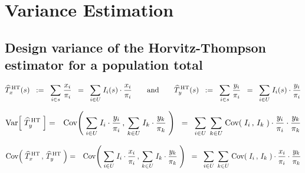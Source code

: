 

\section{Variance Estimation}
\setcounter{theorem}{0}
\setcounter{equation}{0}


\renewcommand{\theenumi}{\roman{enumi}}
\renewcommand{\labelenumi}{\textnormal{(\theenumi)}$\;\;$}


\subsection{Design variance of the Horvitz-Thompson estimator for a population total}

\vskip 0.5cm

\begin{equation*}
\widehat{T}^{\,\textnormal{HT}}_{x}(s)
\;\; := \;\;
	\underset{i \in s}{\sum}\; \dfrac{x_{i}}{\pi_{i}}
\;\; = \;\;
	\underset{i \in U}{\sum}\; I_{i}(s)\cdot\dfrac{x_{i}}{\pi_{i}}
\quad
\quad
\textnormal{and}
\quad
\quad
\widehat{T}^{\,\textnormal{HT}}_{y}(s)
\;\; := \;\;
	\underset{i \in s}{\sum}\; \dfrac{y_{i}}{\pi_{i}}
\;\; = \;\;
	\underset{i \in U}{\sum}\; I_{i}(s)\cdot\dfrac{y_{i}}{\pi_{i}}
\end{equation*}

\begin{eqnarray*}
\textnormal{Var}\!\left[\;\widehat{T}^{\,\textnormal{HT}}_{y}\;\right]
& = &
	\textnormal{Cov}\!\left(\;
		\underset{i \in U}{\sum}\; I_{i}\cdot\dfrac{y_{i}}{\pi_{i}}
		\,,\,
		\underset{k \in U}{\sum}\; I_{k}\cdot\dfrac{y_{k}}{\pi_{k}}
		\;\right)
\;\; = \;\;
	\underset{i \in U}{\sum}\;\,
	\underset{k \in U}{\sum}\;
		\textnormal{Cov}\!\left(\;I_{i}\,,\,I_{k}\;\right)
		\cdot\dfrac{y_{i}}{\pi_{i}}
		\cdot\dfrac{y_{k}}{\pi_{k}}
\end{eqnarray*}

\begin{eqnarray*}
\textnormal{Cov}\!\left(\;
	\widehat{T}^{\,\textnormal{HT}}_{x}
	\,,\,
	\widehat{T}^{\,\textnormal{HT}}_{y}
	\;\right)
& = &
	\textnormal{Cov}\!\left(\;
		\underset{i \in U}{\sum}\; I_{i}\cdot\dfrac{x_{i}}{\pi_{i}}
		\,,\,
		\underset{k \in U}{\sum}\; I_{k}\cdot\dfrac{y_{k}}{\pi_{k}}
		\;\right)
\;\; = \;\;
	\underset{i \in U}{\sum}\;\,
	\underset{k \in U}{\sum}\;
		\textnormal{Cov}\!\left(\;I_{i}\,,\,I_{k}\;\right)
		\cdot\dfrac{x_{i}}{\pi_{i}}
		\cdot\dfrac{y_{k}}{\pi_{k}}
\end{eqnarray*}

